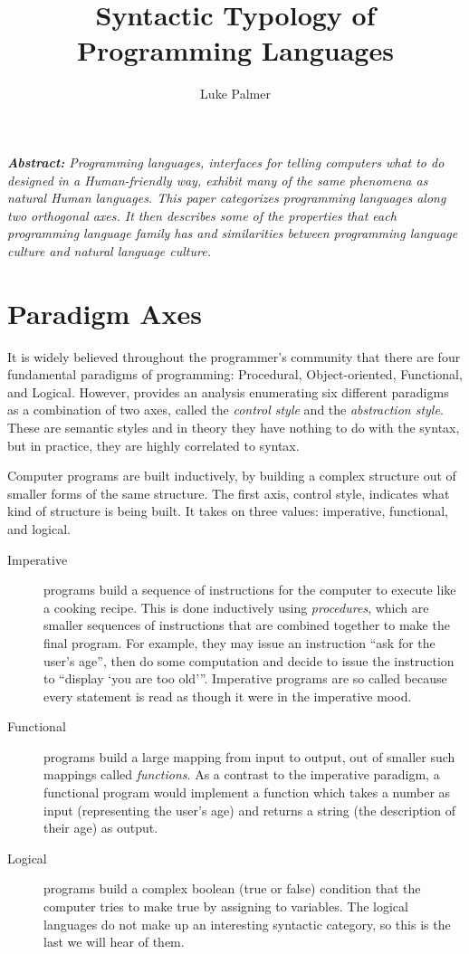 \documentclass[12pt]{article}
\title{Syntactic Typology of Programming Languages}
\author{Luke Palmer}
\begin{document}
\maketitle

\textit{\textbf{Abstract:} Programming languages, interfaces for telling
computers what to do designed in a Human-friendly way, exhibit many of
the same phenomena as natural Human languages.  This paper categorizes
programming languages along two orthogonal axes. It then describes some
of the properties that each programming language family has and
similarities between programming language culture and natural language
culture.}

\section{Paradigm Axes}

It is widely believed throughout the programmer's community that there
are four fundamental paradigms of programming: Procedural,
Object-oriented, Functional, and Logical.   However, \cite{Palmer-2005}
provides an analysis enumerating six different paradigms as a
combination of two axes, called the \textit{control style} and the
\textit{abstraction style}.  These are semantic styles and in theory
they have nothing to do with the syntax, but in practice, they are
highly correlated to syntax.

Computer programs are built inductively, by building a complex structure
out of smaller forms of the same structure.  The first axis, control
style, indicates what kind of structure is being built.  It takes on
three values: imperative, functional, and logical.  

\begin{description}
\item[Imperative] programs build a sequence of instructions for the
computer to execute like a cooking recipe.  This is done inductively
using \textit{procedures}, which are smaller sequences of instructions
that are combined together to make the final program.  For example, they
may issue an instruction ``ask for the user's age'', then do some
computation and decide to issue the instruction to ``display `you are
too old'{}''.  Imperative programs are so called because every statement
is read as though it were in the imperative mood.
\item[Functional] programs build a large mapping from input to output,
out of smaller such mappings called \textit{functions}.  As a contrast
to the imperative paradigm, a functional program would implement a
function which takes a number as input (representing the user's age) and
returns a string (the description of their age) as output. 
\item[Logical] programs build a complex boolean (true or false)
condition that the computer tries to make true by assigning to
variables.  The logical languages do not make up an interesting
syntactic category, so this is the last we will hear of them.
\end{description}
\end{document}
